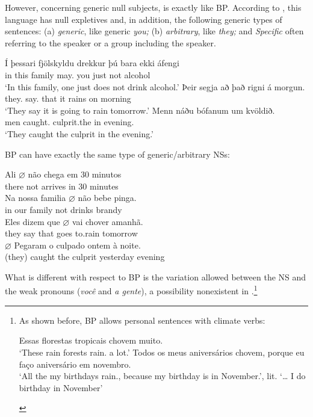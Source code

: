 \documentclass[output=paper]{langsci/langscibook}
\begin{document}
However, concerning generic null subjects,  is exactly like
\gls{BP}. According to \citet{SigurdssonEgerland2009},
this language has null expletives and, in addition, the following generic types
of sentences: (a) \emph{generic}, like generic  \emph{you;} (b)
\emph{arbitrary}, like  \emph{they;} and \emph{Specific} often
referring to the speaker or a group including the speaker.

\ea%
\label{ex:26.50} \parencite[160]{SigurdssonEgerland2009}
    \ea
	\gll	Í þessari      fjölskyldu drekkur þú bara ekki áfengi\\
			in this      family  may.\Tsg{} you just not alcohol\\
	\glt	\enquote*{In this family, one just does not drink alcohol.}
    \ex
	\gll	Þeir  segja     að það rigni á morgun.\\
            they.\M{} say.\Tpl{} that it rains on morning\\
	\glt	\enquote*{They say it is going to rain tomorrow.}
    \ex
	\gll	Menn náðu bófanum um kvöldið.\\
			men caught.\Tpl{} culprit.the in evening.\\
	\glt	\enquote*{They caught the culprit in the evening.}
    \z
\z

\gls{BP} can have exactly the same type of generic/arbitrary NSs:

\ea%
    \label{ex:26.51}
    \ea
    \gll    Ali $\varnothing$ não chega  em 30 minutos\\
            there {} not arrives in 30 minutes\\
    \ex
    \gll    Na nossa familia $\varnothing$ não bebe pinga.\\
            in   our family {}       not drinks brandy\\
    \ex
    \gll    Eles dizem que $\varnothing$  vai  chover  amanhã.\\
            they say  that {} goes to.rain   tomorrow\\
    \ex
    \gll    $\varnothing$ Pegaram o culpado ontem à noite.\\
            (they) caught   the culprit  yesterday evening\\
    \z
\z\largerpage[2]

What is different with respect to \gls{BP} is the
variation allowed between the NS and the weak pronouns (\emph{você} and \emph{a
    gente}), a possibility nonexistent in .\footnote{As shown
    before, \gls{BP} allows personal sentences with
    climate verbs:

\begin{exe}
     Essas florestas tropicais chovem muito.\\
            \enquote*{These rain forests rain.\Tpl{} a lot.}
     Todos os meus aniversários chovem, porque  eu faço aniversário em novembro.\\
            \enquote*{All the my birthdays rain.\Tpl{}, because my birthday is
            in November.}, lit. \enquote*{\dots{} I do birthday in November}
\end{exe}}
\end{document}
